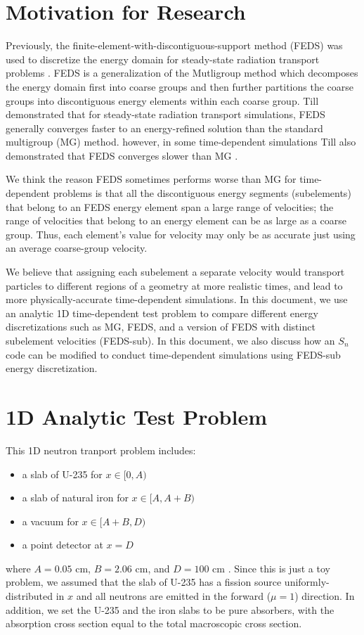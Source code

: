 \documentclass{article}
\begin{document}
\section{Motivation for Research}

Previously, the finite-element-with-discontiguous-support method (FEDS) was used to discretize the energy domain for steady-state radiation transport problems \cite{till2015phd}. FEDS is a generalization of the Mutligroup method which decomposes the energy domain first into coarse groups and then further partitions the coarse groups into discontiguous energy elements within each coarse group. Till demonstrated that for steady-state radiation transport simulations, FEDS generally converges faster to an energy-refined solution than the standard multigroup (MG) method. however, in some time-dependent simulations Till also demonstrated that FEDS converges slower than MG \cite{till2015phd}. 

We think the reason FEDS sometimes performs worse than MG for time-dependent problems is that all the discontiguous energy segments (subelements) that belong to an FEDS energy element span a large range of velocities; the range of velocities that belong to an energy element can be as large as a coarse group. Thus, each element's value for velocity may only be as accurate just using an average coarse-group velocity.

We believe that assigning each subelement a separate velocity would transport particles to different regions of a geometry at more realistic times, and lead to more physically-accurate time-dependent simulations. In this document, we use an analytic 1D time-dependent test problem to compare different energy discretizations such as MG, FEDS, and a version of FEDS with distinct subelement velocities (FEDS-sub). In this document, we also discuss how an $S_n$ code can be modified to conduct time-dependent simulations using FEDS-sub energy discretization.

\section{1D Analytic Test Problem}
This 1D neutron tranport problem includes:
\begin{itemize}
\item a slab of U-235 for $x \in [0,A)$
\item a slab of natural iron for $x \in [A, A+B)$
\item a vacuum for $x \in [A+B,D)$
\item a point detector at $x = D$ 
\end{itemize}
where $A = 0.05$ cm, $B = 2.06$ cm, and $D = 100$ cm \cite{till2015phd}. Since this is just a toy problem, we assumed that the slab of U-235 has a fission source uniformly-distributed in $x$ and all neutrons are emitted in the forward ($\mu =1$) direction. In addition, we set the U-235 and the iron slabs to be pure absorbers, with the absorption cross section equal to the total macroscopic cross section. 
\end{document}
